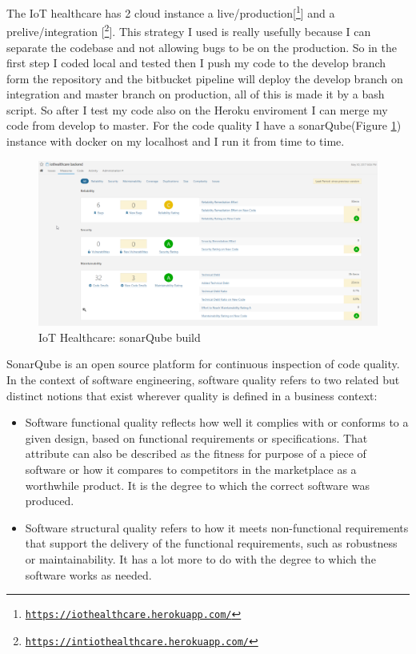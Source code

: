 The IoT healthcare  has 2 cloud instance a live/production[\footnote{\href{https://iothealthcare.herokuapp.com/}{\texttt{https://iothealthcare.herokuapp.com/}}}] and a prelive/integration [\footnote{\href{https://intiothealthcare.herokuapp.com/}{\texttt{https://intiothealthcare.herokuapp.com/}}}]. This strategy I used is really usefully because I can separate the codebase and not allowing bugs to be on the production. So in the first step I coded local and tested then I push my code to the develop branch form the repository and the bitbucket pipeline will deploy the develop branch on integration and master branch on production, all of this is made it by a bash script. So after I test my code also on the Heroku enviroment I can merge my code from develop to master.
For the code quality I have a sonarQube(Figure \ref{fig:sonar}) instance with docker on my localhost and I run it from time to time. 
\newline
\begin{figure}[h]
	\centering
	\includegraphics[width=\linewidth]{images/sonarqube}
	\caption{IoT Healthcare: sonarQube build}
	\label{fig:sonar}
\end{figure}
SonarQube is an open source platform for continuous inspection of code quality.
\newline
In the context of software engineering, software quality refers to two related but distinct notions that exist wherever quality is defined in a business context:
\begin{itemize}
	\item Software functional quality reflects how well it complies with or conforms to a given design, based on functional requirements or specifications. That attribute can also be described as the fitness for purpose of a piece of software or how it compares to competitors in the marketplace as a worthwhile product. It is the degree to which the correct software was produced.
	\item Software structural quality refers to how it meets non-functional requirements that support the delivery of the functional requirements, such as robustness or maintainability. It has a lot more to do with the degree to which the software works as needed.
\end{itemize}
